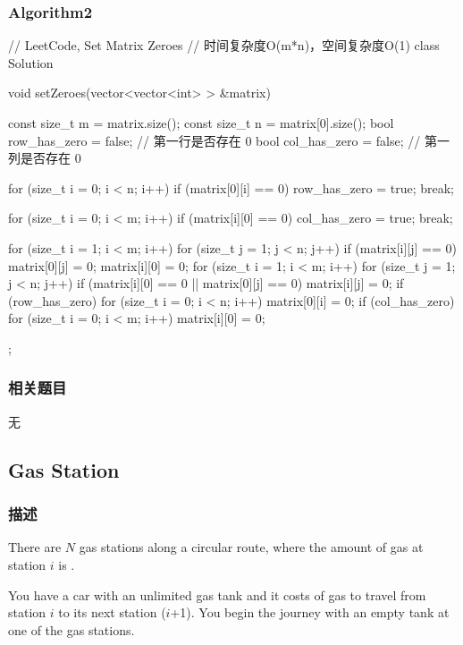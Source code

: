 \subsubsection{Algorithm2}
\begin{Code}
	// LeetCode, Set Matrix Zeroes
	// 时间复杂度O(m*n)，空间复杂度O(1)
	class Solution {
		void setZeroes(vector<vector<int> > &matrix) {
			const size_t m = matrix.size();
			const size_t n = matrix[0].size();
			bool row_has_zero = false; // 第一行是否存在 0
			bool col_has_zero = false; // 第一列是否存在 0
			
			for (size_t i = 0; i < n; i++)
				if (matrix[0][i] == 0) {
					row_has_zero = true;
					break;
				}
			
			for (size_t i = 0; i < m; i++)
				if (matrix[i][0] == 0) {
					col_has_zero = true;
					break;
				}
			
			for (size_t i = 1; i < m; i++)
				for (size_t j = 1; j < n; j++)
					if (matrix[i][j] == 0) {
						matrix[0][j] = 0;
						matrix[i][0] = 0;
					}
			for (size_t i = 1; i < m; i++)
				for (size_t j = 1; j < n; j++)
					if (matrix[i][0] == 0 || matrix[0][j] == 0)
						matrix[i][j] = 0;
			if (row_has_zero)
				for (size_t i = 0; i < n; i++)
					matrix[0][i] = 0;
			if (col_has_zero)
				for (size_t i = 0; i < m; i++)
					matrix[i][0] = 0;
		}
	};
\end{Code}


\subsubsection{相关题目}
\begindot
\item 无
\myenddot


\subsection{Gas Station} %
\label{sec:gas-station}


\subsubsection{描述}
There are $N$ gas stations along a circular route, where the amount of gas at 
station $i$ is .

You have a car with an unlimited gas tank and it costs  of gas to 
travel from station $i$ to its next station ($i$+1). You begin the journey with 
an empty tank at one of the gas stations.

